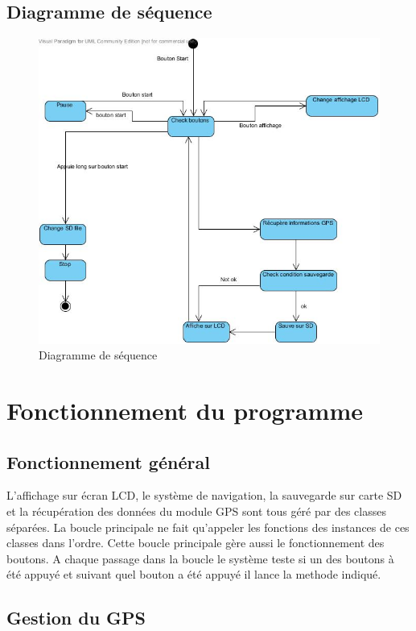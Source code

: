 \documentclass[a4paper,12pt,titlepage]{article}
\begin{document}
\subsection{Diagramme de séquence}

\begin{figure}[H]
	\centering
	\includegraphics[width=\textwidth]{sequence.jpg}
	\caption{Diagramme de séquence}
	\label{sequence}
\end{figure}

\section{Fonctionnement du programme}

\subsection{Fonctionnement général}

L'affichage sur écran LCD, le système de navigation, la sauvegarde sur carte SD et la récupération des données du module GPS sont tous géré par des classes séparées.
La boucle principale ne fait qu'appeler les fonctions des instances de ces classes dans l'ordre. Cette boucle principale gère aussi le fonctionnement des boutons.
A chaque passage dans la boucle le système teste si un des boutons à été appuyé et suivant quel bouton a été appuyé il lance la methode indiqué.

\subsection{Gestion du GPS}
\end{document}
